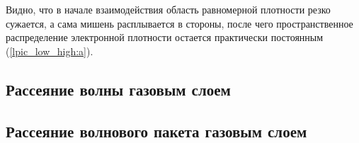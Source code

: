 Видно, что в начале взаимодействия область равномерной плотности резко сужается, а сама мишень расплывается в стороны, после чего пространственное распределение электронной плотности остается практически постоянным (\autoref{lpic_low_high:a}). 

\subsection{Рассеяние волны газовым слоем}

\subsection{Рассеяние волнового пакета газовым слоем}
